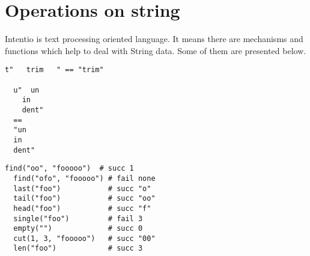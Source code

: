 \chapter{Operations on string}

Intentio is text processing oriented language. It means there are mechanisms and functions which help to deal with String data. Some of them are presented below.

\begin{example}
\begin{lstlisting}[language=intentio]
  t"   trim   " == "trim"

  u"  un
    in
    dent"
  ==
  "un
  in
  dent"
\end{lstlisting}
\end{example}

\begin{example}
\begin{lstlisting}[language=intentio]
  find("oo", "fooooo")  # succ 1
  find("ofo", "fooooo") # fail none
  last("foo")           # succ "o"
  tail("foo")           # succ "oo"
  head("foo")           # succ "f"
  single("foo")         # fail 3
  empty("")             # succ 0
  cut(1, 3, "fooooo")   # succ "00"
  len("foo")            # succ 3
\end{lstlisting}
\end{example}

